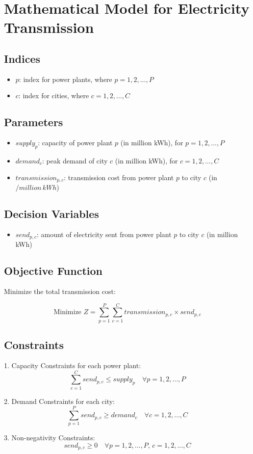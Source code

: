 \documentclass{article}
\begin{document}
\section*{Mathematical Model for Electricity Transmission}

\subsection*{Indices}
\begin{itemize}
    \item $p$: index for power plants, where $p = 1, 2, \ldots, P$
    \item $c$: index for cities, where $c = 1, 2, \ldots, C$
\end{itemize}

\subsection*{Parameters}
\begin{itemize}
    \item $supply_{p}$: capacity of power plant $p$ (in million kWh), for $p = 1, 2, \ldots, P$
    \item $demand_{c}$: peak demand of city $c$ (in million kWh), for $c = 1, 2, \ldots, C$
    \item $transmission_{p,c}$: transmission cost from power plant $p$ to city $c$ (in $/million \, kWh$)
\end{itemize}

\subsection*{Decision Variables}
\begin{itemize}
    \item $send_{p,c}$: amount of electricity sent from power plant $p$ to city $c$ (in million kWh)
\end{itemize}

\subsection*{Objective Function}
Minimize the total transmission cost:

\[
\text{Minimize } Z = \sum_{p=1}^{P} \sum_{c=1}^{C} transmission_{p,c} \times send_{p,c}
\]

\subsection*{Constraints}

1. Capacity Constraints for each power plant:
\[
\sum_{c=1}^{C} send_{p,c} \leq supply_{p} \quad \forall p = 1, 2, \ldots, P
\]

2. Demand Constraints for each city:
\[
\sum_{p=1}^{P} send_{p,c} \geq demand_{c} \quad \forall c = 1, 2, \ldots, C
\]

3. Non-negativity Constraints:
\[
send_{p,c} \geq 0 \quad \forall p = 1, 2, \ldots, P, \, c = 1, 2, \ldots, C
\]
\end{document}
